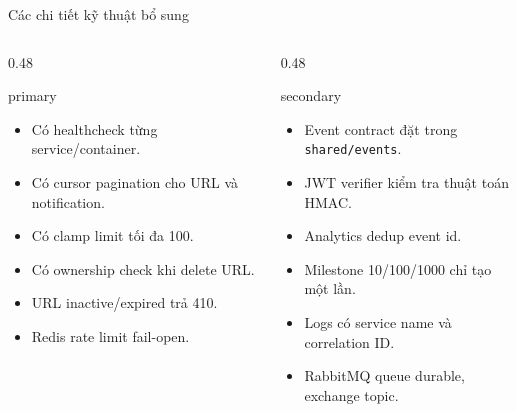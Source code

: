 \documentclass[aspectratio=169]{beamer}
\begin{document}
\begin{frame}{Các chi tiết kỹ thuật bổ sung}
    \begin{columns}[T,onlytextwidth]
        \begin{column}{0.48\textwidth}
            \begin{claimbox}{primary}
                \begin{itemize}\small
                    \item Có healthcheck từng service/container.
                    \item Có cursor pagination cho URL và notification.
                    \item Có clamp limit tối đa 100.
                    \item Có ownership check khi delete URL.
                    \item URL inactive/expired trả 410.
                    \item Redis rate limit fail-open.
                \end{itemize}
            \end{claimbox}
        \end{column}
        \begin{column}{0.48\textwidth}
            \begin{claimbox}{secondary}
                \begin{itemize}\small
                    \item Event contract đặt trong \texttt{shared/events}.
                    \item JWT verifier kiểm tra thuật toán HMAC.
                    \item Analytics dedup event id.
                    \item Milestone 10/100/1000 chỉ tạo một lần.
                    \item Logs có service name và correlation ID.
                    \item RabbitMQ queue durable, exchange topic.
                \end{itemize}
            \end{claimbox}
        \end{column}
    \end{columns}
\end{frame}
\end{document}
